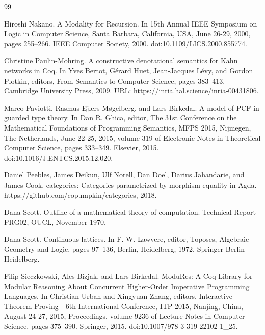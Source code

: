 \documentclass[10pt,a4paper]{article}
\begin{document}
\begin{thebibliography}{99}
\par\noindent    Hiroshi Nakano.  A Modality for Recursion.  In 15th Annual IEEE Symposium on Logic in Computer Science, Santa Barbara, California, USA, June 26-29, 2000, pages 255–266. IEEE Computer Society, 2000.  doi:10.1109/LICS.2000.855774.  

\par\noindent    Christine Paulin-Mohring.  A constructive denotational semantics for Kahn networks in Coq.  In Yves Bertot, Gérard Huet, Jean-Jacques Lévy, and Gordon Plotkin, editors, From Semantics to Computer Science, pages 383–413. Cambridge University Press, 2009.  URL: https://inria.hal.science/inria-00431806.  

\par\noindent    Marco Paviotti, Rasmus Ejlers Møgelberg, and Lars Birkedal.  A model of PCF in guarded type theory.  In Dan R. Ghica, editor, The 31st Conference on the Mathematical Foundations of Programming Semantics, MFPS 2015, Nijmegen, The Netherlands, June 22-25, 2015, volume 319 of Electronic Notes in Theoretical Computer Science, pages 333–349. Elsevier, 2015.  doi:10.1016/J.ENTCS.2015.12.020.  

\par\noindent    Daniel Peebles, James Deikun, Ulf Norell, Dan Doel, Darius Jahandarie, and James Cook.  categories: Categories parametrized by morphism equality in Agda.  https://github.com/copumpkin/categories, 2018.  

\par\noindent    Dana Scott.  Outline of a mathematical theory of computation.  Technical Report PRG02, OUCL, November 1970.  

\par\noindent    Dana Scott.  Continuous lattices.  In F. W. Lawvere, editor, Toposes, Algebraic Geometry and Logic, pages 97–136, Berlin, Heidelberg, 1972. Springer Berlin Heidelberg.  

\par\noindent    Filip Sieczkowski, Ales Bizjak, and Lars Birkedal.  ModuRes: A Coq Library for Modular Reasoning About Concurrent Higher-Order Imperative Programming Languages.  In Christian Urban and Xingyuan Zhang, editors, Interactive Theorem Proving - 6th International Conference, ITP 2015, Nanjing, China, August 24-27, 2015, Proceedings, volume 9236 of Lecture Notes in Computer Science, pages 375–390. Springer, 2015.  doi:10.1007/978-3-319-22102-1\_25.  


\end{thebibliography}
\end{document}
